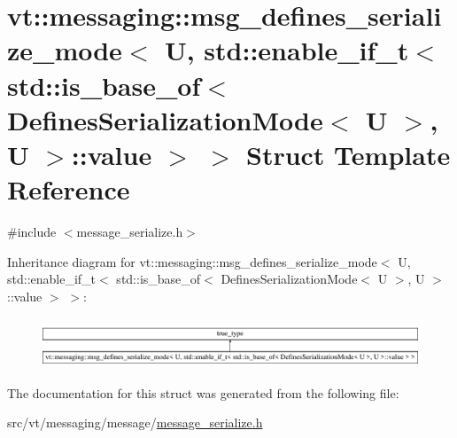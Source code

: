 \hypertarget{structvt_1_1messaging_1_1msg__defines__serialize__mode_3_01_u_00_01std_1_1enable__if__t_3_01std_8698c5f7a65cc513c46123d196b4add1}{}\section{vt\+:\+:messaging\+:\+:msg\+\_\+defines\+\_\+serialize\+\_\+mode$<$ U, std\+:\+:enable\+\_\+if\+\_\+t$<$ std\+:\+:is\+\_\+base\+\_\+of$<$ Defines\+Serialization\+Mode$<$ U $>$, U $>$\+:\+:value $>$ $>$ Struct Template Reference}
\label{structvt_1_1messaging_1_1msg__defines__serialize__mode_3_01_u_00_01std_1_1enable__if__t_3_01std_8698c5f7a65cc513c46123d196b4add1}


{\ttfamily \#include $<$message\+\_\+serialize.\+h$>$}

Inheritance diagram for vt\+:\+:messaging\+:\+:msg\+\_\+defines\+\_\+serialize\+\_\+mode$<$ U, std\+:\+:enable\+\_\+if\+\_\+t$<$ std\+:\+:is\+\_\+base\+\_\+of$<$ Defines\+Serialization\+Mode$<$ U $>$, U $>$\+:\+:value $>$ $>$\+:\begin{figure}[H]
\begin{center}
\leavevmode
\includegraphics[height=1.497326cm]{structvt_1_1messaging_1_1msg__defines__serialize__mode_3_01_u_00_01std_1_1enable__if__t_3_01std_8698c5f7a65cc513c46123d196b4add1}
\end{center}
\end{figure}


The documentation for this struct was generated from the following file\+:\begin{DoxyCompactItemize}
\item 
src/vt/messaging/message/\hyperlink{message__serialize_8h}{message\+\_\+serialize.\+h}\end{DoxyCompactItemize}

